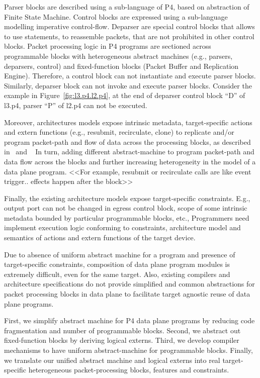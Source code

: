 \documentclass[10pt,sigconf,letterpaper,anonymous]{acmart}
\begin{document}
Parser blocks are described using a sub-language of P4, based on abstraction of Finite State Machine.
Control blocks are expressed using a sub-language modelling imperative control-flow.
Deparser are special control blocks that allows to use statements, to reassemble packets, that are not prohibited in other control blocks.
Packet processing logic in P4 programs are sectioned across programmable blocks with heterogeneous abstract machines (e.g., parsers, deparsers, control) and fixed-function blocks (Packet Buffer and Replication Engine).
Therefore, a control block can not instantiate and execute parser blocks. Similarly, deparser block can not invoke and execute parser blocks.  
Consider the example in Figure~\ref{fig:l3.p4.l2.p4}, at the end of deparser control block ``D'' of l3.p4, parser ``P'' of l2.p4 can not be executed.


Moreover, architectures models expose intrinsic metadata, target-specific actions and extern functions (e.g., resubmit, recirculate, clone) to replicate and/or program packet-path and flow of data across the processing blocks, as described in~\cite{simple_switch.md} and ~\cite{psa}
In turn, adding different abstract-machine to program packet-path and data flow across the blocks and further increasing heterogeneity in the model of a data plane program.
<<For example, resubmit or recirculate calls are like event trigger.. effects happen after the block>>

Finally, the existing architecture models expose target-specific constraints.
E.g., output port can not be changed in egress control block, scope of some intrinsic metadata bounded by particular programmable blocks, etc.,  
Programmers need implement execution logic conforming to constraints, architecture model and semantics of actions and extern functions of the target device.


Due to absence of uniform abstract machine for a program and presence of target-specific constraints, composition of data plane program modules is extremely difficult, even for the same target. 
Also, existing compilers and architecture specifications do not provide simplified and common abstractions for packet processing blocks in data plane to facilitate target agnostic reuse of data plane programs.


First, we simplify abstract machine for P4 data plane programs by reducing code fragmentation and number of programmable blocks.
Second, we abstract out fixed-function blocks by deriving logical externs.
Third, we develop compiler mechanisms to have uniform abstract-machine for programmable blocks.
Finally, we translate our unified abstract machine and logical externs into real target-specific heterogeneous packet-processing blocks, features and constraints.
\end{document}
